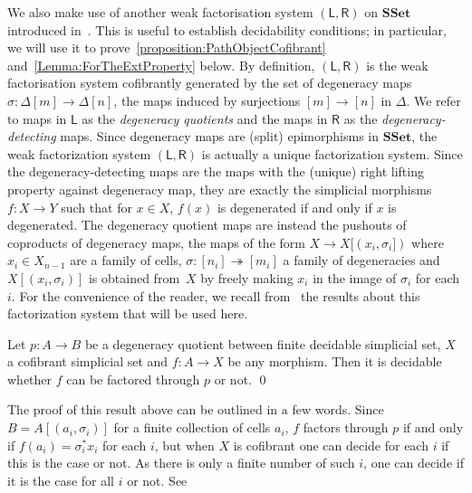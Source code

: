 \documentclass[reqno,10pt,a4paper,oneside]{amsart}
\numberwithin{equation}{section}
\theoremstyle{mythm}
\theoremstyle{mydef}
\theoremstyle{myrmk}
\newcommand{\ie}{\text{i.e.\ }}
\newcommand{\co}{\colon}
\newcommand{\SSet}{\mathbf{SSet}}
\begin{document}
\medskip

We also make use of another weak factorisation system $(\mathsf{L}, \mathsf{R})$ on $\SSet$ introduced in~\cite[Section~3.1]{henry2019qms}. This is useful to establish decidability conditions; in particular, we will use it to prove~\cref{proposition:PathObjectCofibrant} and~\cref{Lemma:ForTheExtProperty} below. By definition, $(\mathsf{L}, \mathsf{R})$ is the
weak factorisation system cofibrantly generated by the set of degeneracy maps $\sigma \co \Delta[m] \to \Delta[n]$, \ie the maps induced by surjections $[m] \rightarrow [n]$ in $\Delta$. We refer to maps in $\mathsf{L}$ as the \emph{degeneracy quotients} and the
maps in $\mathsf{R}$ as the \emph{degeneracy-detecting} maps. Since degeneracy maps are (split) epimorphisms in $\SSet$, the weak factorization system $(\mathsf{L}, \mathsf{R})$ is actually a unique factorization system. Since the degeneracy-detecting maps are the maps with the (unique) right lifting property against degeneracy map,  they are exactly the simplicial morphisms $f \co X \rightarrow Y$ such that for $x \in X$, $f(x)$ is degenerated if and only if $x$ is degenerated. The degeneracy quotient maps are
instead the pushouts of coproducts of degeneracy maps, \ie the maps of the form $X \rightarrow X[(x_i,\sigma_i])$ where $x_i \in X_{n-1}$ are a family of cells,  $\sigma \co [n_i] \twoheadrightarrow [m_i]$ a family of degeneracies and $X[(x_i,\sigma_i)]$ is obtained from~$X$ by freely making $x_i$ in the image of $\sigma_i $ for each $i$. For the convenience of the reader, we recall from~\cite{henry2019qms} 
 the results  about this factorization system that will be used here.


\begin{lemma}
\label{lem:decidability_lift_degen_quo}
Let $p \co A \rightarrow B$ be a degeneracy quotient between finite decidable simplicial set, $X$  a cofibrant simplicial set and $f \co
A \rightarrow X$ be any morphism. Then it is decidable whether $f$ can be factored through $p$ or not.  \qed
\end{lemma}

The proof of this result above can be outlined in a few words. Since $B = A[(a_i,\sigma_i)]$ for a finite collection of cells $a_i$,  $f$ factors through $p$ if and only if $f(a_i) =\sigma_i^*  x_i$ for each $i$, but when $X$ is cofibrant one can decide for each $i$ if this is the case or not. As there is only a finite number of such $i$, one can decide if it is the case for all $i$ or not. See
\end{document}
